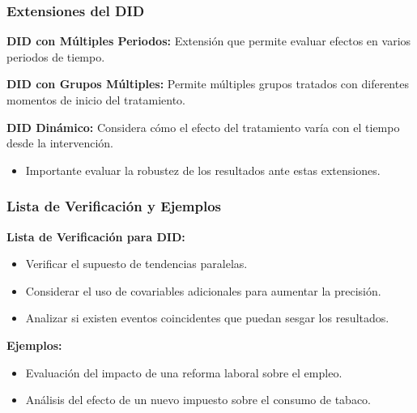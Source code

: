 \documentclass[notes,10pt,aspectratio=169]{beamer}
\begin{document}
\begin{frame}
  \frametitle{Extensiones del DID}

  \textbf{DID con Múltiples Periodos:} Extensión que permite evaluar efectos en varios periodos de tiempo.

  \vspace{1em}
  \textbf{DID con Grupos Múltiples:} Permite múltiples grupos tratados con diferentes momentos de inicio del tratamiento.

  \vspace{1em}
  \textbf{DID Dinámico:} Considera cómo el efecto del tratamiento varía con el tiempo desde la intervención.

  \vspace{1em}
  \begin{itemize}
    \item Importante evaluar la robustez de los resultados ante estas extensiones.
  \end{itemize}
\end{frame}

\begin{frame}
  \frametitle{Lista de Verificación y Ejemplos}

  \textbf{Lista de Verificación para DID:}
  \begin{itemize}
    \item Verificar el supuesto de tendencias paralelas.
    \item Considerar el uso de covariables adicionales para aumentar la precisión.
    \item Analizar si existen eventos coincidentes que puedan sesgar los resultados.
  \end{itemize}

  \vspace{1em}
  \textbf{Ejemplos:}
  \begin{itemize}
    \item Evaluación del impacto de una reforma laboral sobre el empleo.
    \item Análisis del efecto de un nuevo impuesto sobre el consumo de tabaco.
  \end{itemize}
\end{frame}
\end{document}
